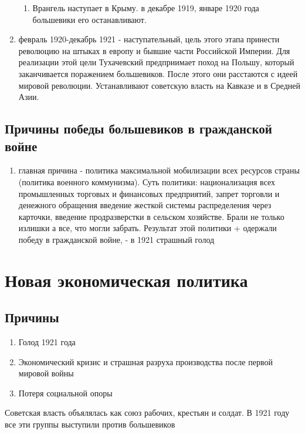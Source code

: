 \documentclass[a4paper]{article}
\begin{document}
\begin{enumerate}
\begin{enumerate}
        \item Врангель наступает в Крыму. в декабре 1919, январе 1920 года большевики его останавливают.
    \end{enumerate}
    \item февраль 1920-декабрь 1921 - наступательный, цель этого этапа принести революцию на штыках в европу и бывшие части Российской Империи. Для реализации этой цели Тухачевский предприимает поход на Польшу, который заканчивается поражением большевиков. После этого они расстаются с идеей мировой революции. Устанавливают советскую власть на Кавказе и в Средней Азии.
\end{enumerate}

    \subsection{Причины победы большевиков в гражданской войне}
    \begin{enumerate}
        \item главная причина - политика максимальной мобилизации всех ресурсов страны (политика военного коммунизма). Суть политики: национализация всех промышленных торговых и финансовых предприятий, запрет торговли и денежного обращения введение жесткой системы распределения через карточки, введение продразверстки в сельском хозяйстве. Брали не только излишки а все, что могли забрать. Результат этой политики + одержали победу в гражданской войне, - в 1921 страшный голод
    \end{enumerate}

\section{Новая экономическая политика}
\subsection{Причины}

\begin{enumerate}
    \item Голод 1921 года
    \item Экономический кризис и страшная разруха производства после первой мировой войны
    \item Потеря социальной опоры
\end{enumerate}

Советская власть объялялась как союз рабочих, крестьян и солдат. В 1921 году все эти группы выступили против большевиков
\end{document}
